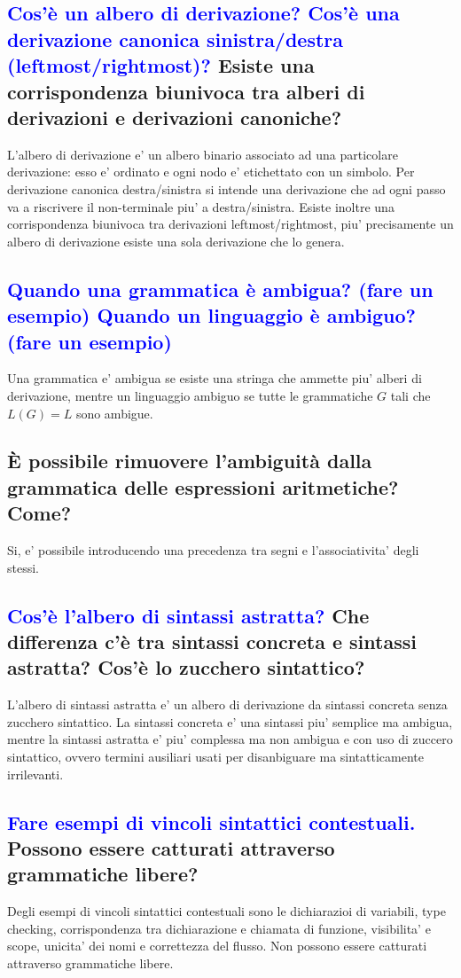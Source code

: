 \documentclass{article}
\begin{document}
\subsection{\textcolor{blue}{Cos'è un albero di derivazione? Cos'è una derivazione canonica sinistra/destra (leftmost/rightmost)?} Esiste una corrispondenza biunivoca tra alberi di derivazioni e derivazioni canoniche?}
L'albero di derivazione e' un albero binario associato ad una particolare derivazione: esso e' ordinato e ogni nodo e' etichettato con un simbolo.
Per derivazione canonica destra/sinistra si intende una derivazione che ad ogni passo va a riscrivere il non-terminale piu' a destra/sinistra.
Esiste inoltre una corrispondenza biunivoca tra derivazioni leftmost/rightmost, piu' precisamente un albero di derivazione esiste una sola derivazione che lo genera.
\subsection{\textcolor{blue}{Quando una grammatica è ambigua? (fare un esempio) Quando un linguaggio è ambiguo? (fare un esempio)}}
Una grammatica e' ambigua se esiste una stringa che ammette piu' alberi di derivazione, mentre un linguaggio ambiguo se tutte le grammatiche $G$ tali che $L(G) = L$ sono ambigue.
\subsection{È possibile rimuovere l'ambiguità dalla grammatica delle espressioni aritmetiche? Come?}
Si, e' possibile introducendo una precedenza tra segni e l'associativita' degli
stessi.
\subsection{\textcolor{blue}{Cos'è l'albero di sintassi astratta?} Che differenza c'è tra sintassi concreta e sintassi astratta? Cos'è lo zucchero sintattico?}
L'albero di sintassi astratta e' un albero di derivazione da sintassi concreta senza zucchero sintattico.
La sintassi concreta e' una sintassi piu' semplice ma ambigua, mentre la sintassi astratta e' piu' complessa ma non ambigua e con uso di zuccero sintattico,
ovvero termini ausiliari usati per disanbiguare ma sintatticamente irrilevanti.
\subsection{\textcolor{blue}{Fare esempi di vincoli sintattici contestuali.} Possono essere catturati attraverso grammatiche libere?}
Degli esempi di vincoli sintattici contestuali sono le dichiarazioi di variabili, type checking, corrispondenza tra dichiarazione e chiamata di funzione, visibilita' e scope, unicita' dei nomi e correttezza del flusso.
Non possono essere catturati attraverso grammatiche libere.
\end{document}
